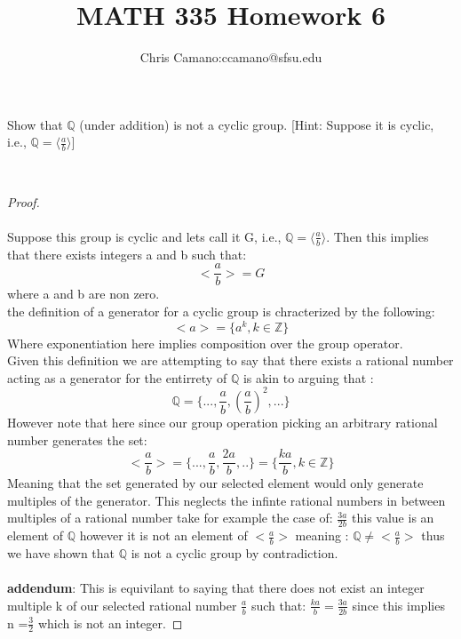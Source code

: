 \documentclass[11pt]{article}
\author{Chris Camano:ccamano@sfsu.edu}
\title{MATH 335  Homework 6 }
\date
\theoremstyle{definition}  %
\newcommand{\Z}{\mathbb{Z}}
\newcommand{\Q}{\mathbb{Q}}
\begin{document}
\maketitle


\begin{tcolorbox}[title=Question 1]
Show that $\Q$ (under addition) is not a cyclic group. [Hint: Suppose it is cyclic, i.e., $\Q = \langle \frac{a}{b} \rangle$]
\end{tcolorbox}\\
\begin{proof}\\\\
  Suppose this group is  cyclic and lets call it G, i.e., $\Q = \langle \frac{a}{b} \rangle$. Then this implies that there exists integers a and b such that:
  \[
    <\frac{a}{b}> = G
  \]
  where a and b are non zero.\\

  the definition of a generator for a cyclic group is chracterized by the following:
  \[
    <a>=\{a^k, k \in \Z\}
  \]
  Where exponentiation here implies composition over the group operator. \\
   Given this definition we are attempting to say that there exists a rational  number acting as a generator for the entirrety of $\mathbb{Q}$ is akin to arguing that :
   \[
     \Q=\{...,\frac{a}{b},(\frac{a}{b})^2,...\}
   \]
   However note that here since our group operation picking an arbitrary rational number generates the set:
  \[
   <\frac{a}{b}>=\{...,\frac{a}{b},\frac{2a}{b},..\}=\{\frac{ka}{b}, k \in \Z\}
  \]
  Meaning that the set generated by our selected element would only generate multiples of the generator. This neglects the infinte rational numbers in between multiples of a rational number take for example the case of: $\frac{3a}{2b}$ this value is an element of $\Q$ however it is not an element of $<\frac{a}{b}>$ meaning : $\Q\neq <\frac{a}{b}>$ thus we have shown that $\Q$ is not a cyclic group by contradiction.\\\\
  \textbf{addendum}: This is equivilant to saying that there does not exist an integer multiple k of our selected rational number $\frac{a}{b}$ such that: $\frac{ka}{b}=\frac{3a}{2b}$ since this implies n =$\frac{3}{2}$ which is not an integer.
\end{proof}
\end{document}
